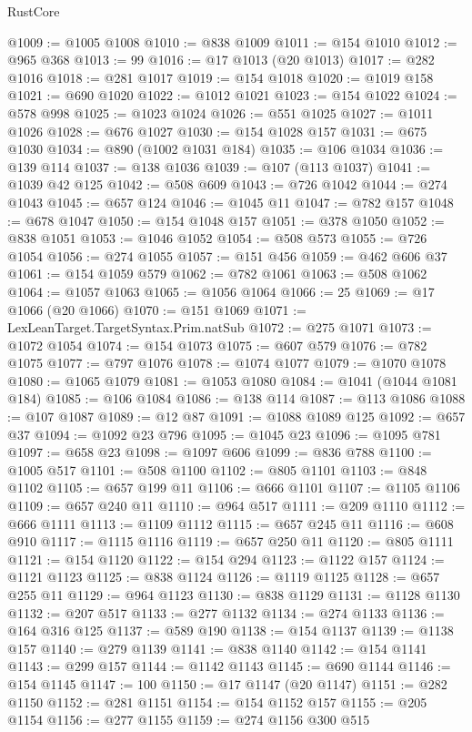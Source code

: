 \begin{lexlean}{RustCore}
\begin{coremodule}
@1009 := @1005 @1008
@1010 := @838 @1009
@1011 := @154 @1010
@1012 := @965 @368
@1013 := 99
@1016 := @17 @1013 (@20 @1013)
@1017 := @282 @1016
@1018 := @281 @1017
@1019 := @154 @1018
@1020 := @1019 @158
@1021 := @690 @1020
@1022 := @1012 @1021
@1023 := @154 @1022
@1024 := @578 @998
@1025 := @1023 @1024
@1026 := @551 @1025
@1027 := @1011 @1026
@1028 := @676 @1027
@1030 := @154 @1028 @157
@1031 := @675 @1030
@1034 := @890 (@1002 @1031 @184)
@1035 := @106 @1034
@1036 := @139 @114
@1037 := @138 @1036
@1039 := @107 (@113 @1037)
@1041 := @1039 @42 @125
@1042 := @508 @609
@1043 := @726 @1042
@1044 := @274 @1043
@1045 := @657 @124
@1046 := @1045 @11
@1047 := @782 @157
@1048 := @678 @1047
@1050 := @154 @1048 @157
@1051 := @378 @1050
@1052 := @838 @1051
@1053 := @1046 @1052
@1054 := @508 @573
@1055 := @726 @1054
@1056 := @274 @1055
@1057 := @151 @456
@1059 := @462 @606 @37
@1061 := @154 @1059 @579
@1062 := @782 @1061
@1063 := @508 @1062
@1064 := @1057 @1063
@1065 := @1056 @1064
@1066 := 25
@1069 := @17 @1066 (@20 @1066)
@1070 := @151 @1069
@1071 := LexLeanTarget.TargetSyntax.Prim.natSub
@1072 := @275 @1071
@1073 := @1072 @1054
@1074 := @154 @1073
@1075 := @607 @579
@1076 := @782 @1075
@1077 := @797 @1076
@1078 := @1074 @1077
@1079 := @1070 @1078
@1080 := @1065 @1079
@1081 := @1053 @1080
@1084 := @1041 (@1044 @1081 @184)
@1085 := @106 @1084
@1086 := @138 @114
@1087 := @113 @1086
@1088 := @107 @1087
@1089 := @12 @87
@1091 := @1088 @1089 @125
@1092 := @657 @37
@1094 := @1092 @23 @796
@1095 := @1045 @23
@1096 := @1095 @781
@1097 := @658 @23
@1098 := @1097 @606
@1099 := @836 @788
@1100 := @1005 @517
@1101 := @508 @1100
@1102 := @805 @1101
@1103 := @848 @1102
@1105 := @657 @199 @11
@1106 := @666 @1101
@1107 := @1105 @1106
@1109 := @657 @240 @11
@1110 := @964 @517
@1111 := @209 @1110
@1112 := @666 @1111
@1113 := @1109 @1112
@1115 := @657 @245 @11
@1116 := @608 @910
@1117 := @1115 @1116
@1119 := @657 @250 @11
@1120 := @805 @1111
@1121 := @154 @1120
@1122 := @154 @294
@1123 := @1122 @157
@1124 := @1121 @1123
@1125 := @838 @1124
@1126 := @1119 @1125
@1128 := @657 @255 @11
@1129 := @964 @1123
@1130 := @838 @1129
@1131 := @1128 @1130
@1132 := @207 @517
@1133 := @277 @1132
@1134 := @274 @1133
@1136 := @164 @316 @125
@1137 := @589 @190
@1138 := @154 @1137
@1139 := @1138 @157
@1140 := @279 @1139
@1141 := @838 @1140
@1142 := @154 @1141
@1143 := @299 @157
@1144 := @1142 @1143
@1145 := @690 @1144
@1146 := @154 @1145
@1147 := 100
@1150 := @17 @1147 (@20 @1147)
@1151 := @282 @1150
@1152 := @281 @1151
@1154 := @154 @1152 @157
@1155 := @205 @1154
@1156 := @277 @1155
@1159 := @274 @1156 @300 @515

\end{coremodule}
\end{lexlean}
